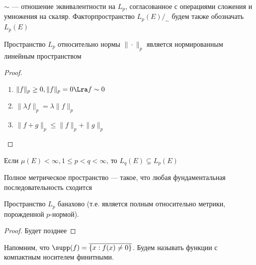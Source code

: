 \begin{note}
    \(\sim\) --- отношение эквивалентности на \(L_p\), согласованное с операциями сложения и умножения на скаляр. Факторпространство \(L_p(E)/_\sim\) будем также обозначать \(L_p(E)\)
\end{note}

\begin{corollary}
    Пространство \(L_p\) относительно нормы \(\|\cdot\|_p\) является нормированным линейным пространством
\end{corollary}
\begin{proof}\indent
    \begin{enumerate}
        \item \(\|f\|_p \ge 0, \|f\|_p = 0 \Lra f \sim 0\)
        \item \(\|\lambda f\|_p = \lambda \|f\|_p\)
        \item \(\|f + g\|_p \le \|f\|_p + \|g\|_p\)
    \end{enumerate}
\end{proof}

\begin{problem}
    Если \(\mu(E) < \infty, 1 \le p < q < \infty\), то \(L_q(E) \subsetneq L_p(E)\)
\end{problem}

\begin{reminder}
    Полное метрическое пространство --- такое, что любая фундаментальная последовательность сходится
\end{reminder}

\begin{theorem}[Рисса]
    Пространство \(L_p\) банахово (т.е. является полным относительно метрики, порожденной \(p\)-нормой). 
\end{theorem}
\begin{proof}
    Будет позднее
\end{proof}

\begin{reminder}
    Напомним, что \(\supp(f) = \overline{\{x: f(x) \ne 0\}}\). Будем называть функции с компактным носителем финитными.
\end{reminder}

